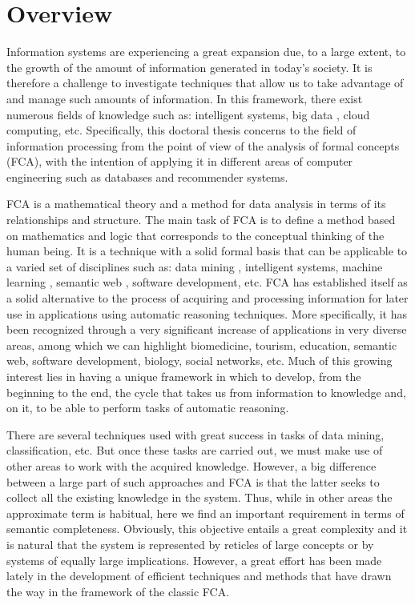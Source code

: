 \pagestyle{empty}
\chapter*{Overview}


\pagestyle{headings}

Information systems are experiencing a great expansion due, to a large extent, to the growth of the amount of information generated in today's society. It is therefore a challenge to investigate techniques that allow us to take advantage of and manage such amounts of information. In this framework, there exist numerous fields of knowledge such as: intelligent systems, big data \cite{Miao2014}, cloud computing, etc. Specifically, this doctoral thesis concerns to the field of information processing from the point of view of the analysis of formal concepts (FCA), with the intention of applying it in different areas of computer engineering such as databases and recommender systems.


FCA is a mathematical theory and a method for data analysis in terms of its relationships and structure. The main task of FCA is to define a method based on mathematics and logic that corresponds to the conceptual thinking of the human being. It is a technique with a solid formal basis \cite{Ganter1997} that can be applicable to a varied set of disciplines such as: data mining \cite{Stumme2002}, intelligent systems, machine learning \cite{Mitchell1997}, semantic web \cite{Wang2006}, software development, etc. FCA has established itself as a solid alternative to the process of acquiring and processing information for later use in applications using automatic reasoning techniques. More specifically, it has been recognized through a very significant increase of applications in very diverse areas, among which we can highlight biomedicine, tourism, education, semantic web, software development, biology, social networks, etc. Much of this growing interest lies in having a unique framework in which to develop, from the beginning to the end, the cycle that takes us from information to knowledge and, on it, to be able to perform tasks of automatic reasoning.

There are several techniques used with great success in tasks of data mining, classification, etc. But once these tasks are carried out, we must make use of other areas to work with the acquired knowledge. However, a big difference between a large part of such approaches and FCA is that the latter seeks to collect all the existing knowledge in the system. Thus, while in other areas the approximate term is habitual, here we find an important requirement in terms of semantic completeness. Obviously, this objective entails a great complexity and it is natural that the system is represented by reticles of large concepts or by systems of equally large implications. However, a great effort has been made lately in the development of efficient techniques and methods that have drawn the way in the framework of the classic FCA.

